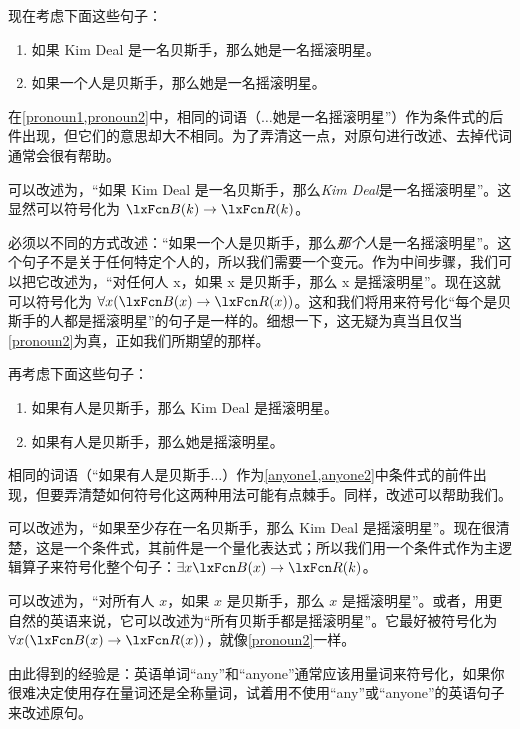 现在考虑下面这些句子：


\begin{enumerate}
		\item\label{pronoun1} 如果 Kim Deal 是一名贝斯手，那么她是一名摇滚明星。
		\item\label{pronoun2} 如果一个人是贝斯手，那么她是一名摇滚明星。
	\end{enumerate}


在\cref*{pronoun1,pronoun2}中，相同的词语（$\ldots$她是一名摇滚明星”）作为条件式的后件出现，但它们的意思却大不相同。为了弄清这一点，对原句进行改述、去掉代词通常会很有帮助。

可以改述为，“如果 Kim Deal 是一名贝斯手，那么\emph{Kim Deal}是一名摇滚明星”。这显然可以符号化为 $\atom{B}{k} \eif \atom{R}{k}$。

必须以不同的方式改述：“如果一个人是贝斯手，那么\emph{那个人}是一名摇滚明星”。这个句子不是关于任何特定个人的，所以我们需要一个变元。作为中间步骤，我们可以把它改述为，“对任何人 x，如果 x 是贝斯手，那么 x 是摇滚明星”。现在这就可以符号化为 $\forall x (\atom{B}{x} \eif \atom{R}{x})$。这和我们将用来符号化“每个是贝斯手的人都是摇滚明星”的句子是一样的。细想一下，这无疑为真当且仅当\cref*{pronoun2}为真，正如我们所期望的那样。

再考虑下面这些句子：


\begin{enumerate}
		\item\label{anyone1} 如果有人是贝斯手，那么 Kim Deal 是摇滚明星。
		\item\label{anyone2} 如果有人是贝斯手，那么她是摇滚明星。
	\end{enumerate}


相同的词语（“如果有人是贝斯手$\ldots$）作为\cref*{anyone1,anyone2}中条件式的前件出现，但要弄清楚如何符号化这两种用法可能有点棘手。同样，改述可以帮助我们。

可以改述为，“如果至少存在一名贝斯手，那么 Kim Deal 是摇滚明星”。现在很清楚，这是一个条件式，其前件是一个量化表达式；所以我们用一个条件式作为主逻辑算子来符号化整个句子：$\exists x \atom{B}{x} \eif \atom{R}{k}$。

可以改述为，“对所有人 $x$，如果 $x$ 是贝斯手，那么 $x$ 是摇滚明星”。或者，用更自然的英语来说，它可以改述为“所有贝斯手都是摇滚明星”。它最好被符号化为 $\forall x(\atom{B}{x} \eif \atom{R}{x})$，就像\cref*{pronoun2}一样。

由此得到的经验是：英语单词“any”和“anyone”通常应该用量词来符号化，如果你很难决定使用存在量词还是全称量词，试着用不使用“any”或“anyone”的英语句子来改述原句。

